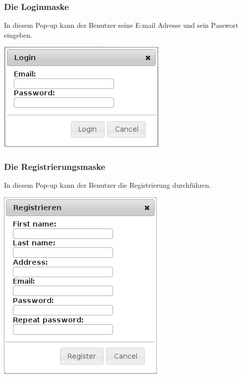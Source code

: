 \documentclass[a4paper,10pt,titlepage]{article}
\begin{document}
\subsubsection{Die Loginmaske}
In diesem Pop-up kann der Benutzer seine E-mail Adresse und sein Passwort eingeben.
\begin {center}
\includegraphics[scale=0.5]{media/web/Login.png}
\end {center}
\subsubsection{Die Registrierungsmaske}
In diesem Pop-up kann der Benutzer die Registrierung durchführen.
\begin {center}
\includegraphics[scale=0.5]{media/web/Register.png}
\end {center}
\end{document}

